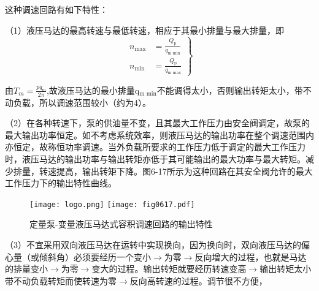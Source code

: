 这种调速回路有如下特性：

（1）液压马达的最高转速与最低转速，相应于其最小排量与最大排量，即
\begin{equation}
\left.
\begin{aligned}
n_\text{max}&=\frac{Q_\text{p}}{q_\text{m\ min}}\\
n_\text{min}&=\frac{Q_\text{p}}{q_\text{m\ max}}
\end{aligned}
\right\}
\end{equation}

由$T_m=\frac{pq_\text{m}}{2\pi}$,故液压马达的最小排量q$_\text{m min}$不能调得太小，否则输出转矩太小，带不动负载，所以调速范围较小（约为4）。

（2）在各种转速下，泵的供油量不变，且其最大工作压力由安全阀调定，故泵的最大输出功率恒定。如不考虑系统效率，则液压马达的输出功率在整个调速范围内亦恒定，故称恒功率调速。当外负载所要求的工作压力低于调定的最大工作压力时，液压马达的输出功率与输出转矩亦低于其可能输出的最大功率与最大转矩。减少排量，转速提高，输出转矩下降。图6-17所示为这种回路在其安全阀允许的最大工作压力下的输出特性曲线。
\begin{figure}\centering
\ifOpenSource
\texttt{[image: logo.png]}
\else
\texttt{[image: fig0617.pdf]}
\fi
\caption{定量泵-变量液压马达式容积调速回路的输出特性}
\label{fig:fig0617}
\end{figure}

（3）不宜采用双向液压马达在运转中实现换向，因为换向时，双向液压马达的偏心量（或倾斜角）必须要经历一个变小$\rightarrow$为零$\rightarrow$反向增大的过程，也就是马达的排量变小$\rightarrow$为零$\rightarrow$变大的过程。输出转矩就要经历转速变高$\rightarrow$输出转矩太小带不动负载转矩而使转速为零$\rightarrow$反向高转速的过程。调节很不方便，

